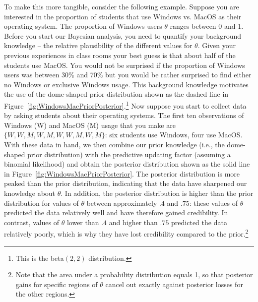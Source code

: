 \documentclass[man]{apa7}
\begin{document}
To make this more tangible, consider the following example. Suppose you are interested in the proportion of students that use Windows vs. MacOS as their operating system. The proportion of Windows users $\theta$ ranges between 0 and 1. Before you start our Bayesian analysis, you need to quantify your background knowledge -- the relative plausibility of the different values for $\theta$. Given your previous experiences in class rooms your best guess is that about half of the students use MacOS. You would not be surprised if the  proportion of Windows users was between 30\% and 70\% but you would be rather surprised to find either no Windows or exclusive Windows usage. This background knowledge motivates the use of the dome-shaped prior distribution shown as the dashed line in Figure~\ref{fig:WindowsMacPriorPosterior}.\footnote{This is the beta$(2,2)$ distribution.} Now suppose you start to collect data by asking students about their operating systems. The first ten observations of Windows (W) and MacOS (M) usage that you make are $\{W, W, M, W, M, W, W, M, W, M\}$: six students use Windows, four use MacOS. With these data in hand, we then combine our prior knowledge (i.e., the dome-shaped prior distribution) with the predictive updating factor (assuming a binomial likelihood) and obtain the posterior distribution shown as the solid line in Figure~\ref{fig:WindowsMacPriorPosterior}. The posterior distribution is more peaked than the prior distribution, indicating that the data have sharpened our knowledge about $\theta$. In addition, the posterior distribution is higher than the prior distribution for values of $\theta$ between approximately $.4$ and $.75$: these values of $\theta$ predicted the data relatively well and have therefore gained credibility. In contrast, values of $\theta$ lower than $.4$ and higher than $.75$ predicted the data relatively poorly, which is why they have lost credibility compared to the prior.\footnote{Note that the area under a probability distribution equals 1, so that posterior gains for specific regions of $\theta$ cancel out exactly against posterior losses for the other regions.}  
\end{document}
